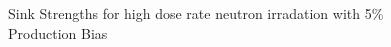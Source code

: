 \documentclass[a4paper]{article}
\begin{document}
      \begin{figure}[h!]  %
        \centering
        \qquad
        \caption{Sink Strengths for high dose rate neutron irradation with 5\% Production Bias}
        \label{figure:sink_strengths_neutron_5_1e-3}
      \end{figure}
\end{document}
